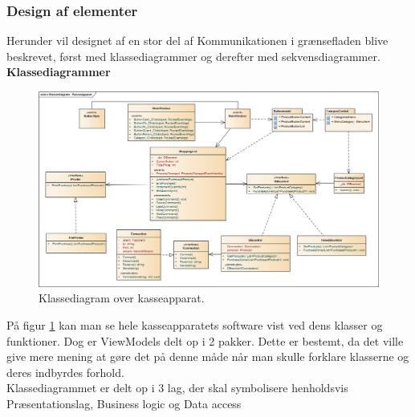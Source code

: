 \subsubsection{Design af elementer}
Herunder vil designet af en stor del af Kommunikationen i grænsefladen blive beskrevet, først med klassediagrammer og derefter med sekvensdiagrammer.\\

\textbf{Klassediagrammer}\\

\begin{figure}[H]
	\centering
	\includegraphics[width=1.2\textwidth, angle=90]{Systemdesign/Frontend/GUI/DesignOgStruktur/Pics/KlassediagramKasseApparat}
	\caption{Klassediagram over kasseapparat.}
	\label{fig:KasseKlasse}
\end{figure}

På figur \ref{fig:KasseKlasse} kan man se hele kasseapparatets software vist ved dens klasser og funktioner. Dog er ViewModels delt op i 2 pakker. Dette er bestemt, da det ville give mere mening at gøre det på denne måde når man skulle forklare klasserne og deres indbyrdes forhold. \\
Klassediagrammet er delt op i 3 lag, der skal symbolisere henholdsvis Præsentationslag, Business logic og Data access

